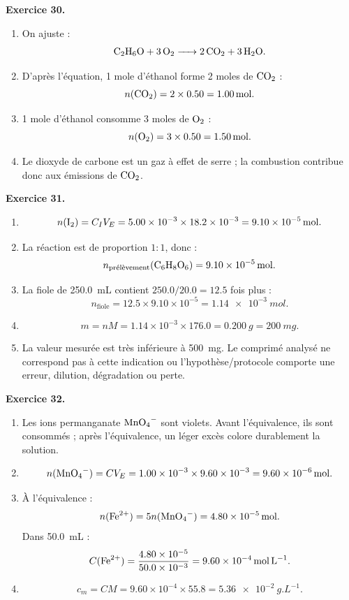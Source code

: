\documentclass[11pt,a4paper]{article}
\newcommand{\corr}[2]{
  \begin{correctionbox}
  \textbf{Exercice #1.} #2
  \end{correctionbox}
}
\begin{document}
\corr{30}{
\begin{enumerate}
  \item On ajuste :
  \[
  \ce{C2H6O + 3O2 -> 2CO2 + 3H2O}.
  \]
  \item D'après l'équation, 1 mole d'éthanol forme 2 moles de $\ce{CO2}$ :
  \[
  n(\ce{CO2})=2\times 0.50=\SI{1.00}{mol}.
  \]
  \item 1 mole d'éthanol consomme 3 moles de $\ce{O2}$ :
  \[
  n(\ce{O2})=3\times 0.50=\SI{1.50}{mol}.
  \]
  \item Le dioxyde de carbone est un gaz à effet de serre ; la combustion contribue donc aux émissions de $\ce{CO2}$.
\end{enumerate}
}

\corr{31}{
\begin{enumerate}
  \item
  \[
  n(\ce{I2})=C_IV_E=5.00\times 10^{-3}\times 18.2\times 10^{-3}
  =\SI{9.10e-5}{mol}.
  \]
  \item La réaction est de proportion $1:1$, donc :
  \[
  n_{\text{prélèvement}}(\ce{C6H8O6})=\SI{9.10e-5}{mol}.
  \]
  \item La fiole de \SI{250.0}{mL} contient $250.0/20.0=12.5$ fois plus :
  \[
  n_{\text{fiole}}=12.5\times 9.10\times 10^{-5}
  =\SI{1.14e-3}{mol}.
  \]
  \item
  \[
  m=nM=1.14\times 10^{-3}\times 176.0=\SI{0.200}{g}=\SI{200}{mg}.
  \]
  \item La valeur mesurée est très inférieure à \SI{500}{mg}. Le comprimé analysé ne correspond pas à cette indication ou l'hypothèse/protocole comporte une erreur, dilution, dégradation ou perte.
\end{enumerate}
}

\corr{32}{
\begin{enumerate}
  \item Les ions permanganate $\ce{MnO4-}$ sont violets. Avant l'équivalence, ils sont consommés ; après l'équivalence, un léger excès colore durablement la solution.
  \item
  \[
  n(\ce{MnO4-})=CV_E=1.00\times 10^{-3}\times 9.60\times 10^{-3}
  =\SI{9.60e-6}{mol}.
  \]
  \item À l'équivalence :
  \[
  n(\ce{Fe^{2+}})=5n(\ce{MnO4-})=\SI{4.80e-5}{mol}.
  \]
  Dans \SI{50.0}{mL} :
  \[
  C(\ce{Fe^{2+}})=\frac{4.80\times 10^{-5}}{50.0\times 10^{-3}}
  =\SI{9.60e-4}{mol.L^{-1}}.
  \]
  \item
  \[
  c_m=CM=9.60\times 10^{-4}\times 55.8
  =\SI{5.36e-2}{g.L^{-1}}.
  \]
\end{enumerate}
}
\end{document}
